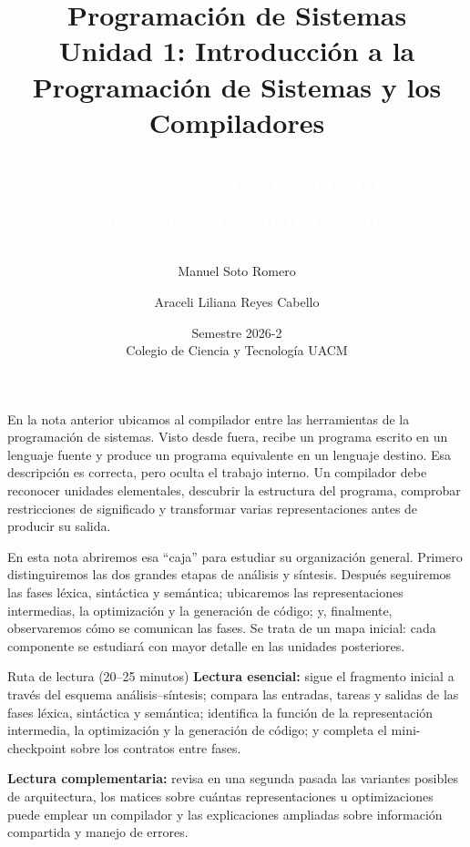 \documentclass[11pt,spanish]{article}
\newcommand{\cf}[2]{%
    \colorbox{#1}{\textcolor{white}{\strut #2}}%
}
\begin{document}

\title{Programación de Sistemas\\
Unidad 1: Introducción a la Programación de Sistemas y los Compiladores\\ \bigskip
\cf{rojo7a3c3d}{\textbf{\Large Nota de clase 02: Estructura y fases de un compilador}}}
\author{Manuel Soto Romero \and Araceli Liliana Reyes Cabello}
\date{Semestre 2026-2 \\ Colegio de Ciencia y Tecnología UACM}

\maketitle
\renewcommand*{\thefootnote}{\arabic{footnote}}
\setcounter{footnote}{0}

En la nota anterior ubicamos al compilador entre las herramientas de la programación de sistemas. Visto desde fuera, recibe un programa escrito en un lenguaje fuente y produce un programa equivalente en un lenguaje destino. Esa descripción es correcta, pero oculta el trabajo interno. Un compilador debe reconocer unidades elementales, descubrir la estructura del programa, comprobar restricciones de significado y transformar varias representaciones antes de producir su salida.

En esta nota abriremos esa ``caja'' para estudiar su organización general. Primero distinguiremos las dos grandes etapas de análisis y síntesis. Después seguiremos las fases léxica, sintáctica y semántica; ubicaremos las representaciones intermedias, la optimización y la generación de código; y, finalmente, observaremos cómo se comunican las fases. Se trata de un mapa inicial: cada componente se estudiará con mayor detalle en las unidades posteriores.

\begin{ruta}{Ruta de lectura (20--25 minutos)}
\textbf{Lectura esencial:} sigue el fragmento inicial a través del esquema análisis--síntesis; compara las entradas, tareas y salidas de las fases léxica, sintáctica y semántica; identifica la función de la representación intermedia, la optimización y la generación de código; y completa el mini-checkpoint sobre los contratos entre fases.

\textbf{Lectura complementaria:} revisa en una segunda pasada las variantes posibles de arquitectura, los matices sobre cuántas representaciones u optimizaciones puede emplear un compilador y las explicaciones ampliadas sobre información compartida y manejo de errores.
\end{ruta}
\end{document}
